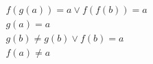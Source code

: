 \begin{align*}
%
& f(g(a)) = a \lor f(f(b)) = a
~\\~
& g(a) = a
~\\~
& g(b)  \neq  g(b) \lor f(b) = a
~\\~
& f(a)  \neq  a
%
\end{align*}
